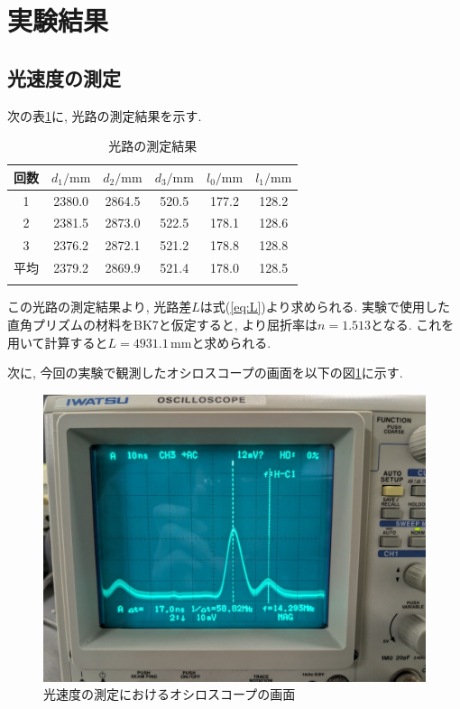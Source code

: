 \documentclass{jarticle}
\begin{document}
\section{実験結果}


\subsection{光速度の測定}

次の表\ref{tb:lightspeed-distance}に, 光路の測定結果を示す.

\begin{table}[h]
  \centering
  \caption{光路の測定結果}
  \begin{tabular}{cccccc}
    \hline
    回数 & $d_1/\mathrm{mm}$ & $d_2/\mathrm{mm}$ & $d_3/\mathrm{mm}$ & $l_0/\mathrm{mm}$ & $l_1/\mathrm{mm}$ \\
    \hline
    1 & 2380.0 & 2864.5 & 520.5 & 177.2 & 128.2 \\
    2 & 2381.5 & 2873.0 & 522.5 & 178.1 & 128.6 \\
    3 & 2376.2 & 2872.1 & 521.2 & 178.8 & 128.8 \\
    \hline
    平均 & 2379.2 & 2869.9 & 521.4 & 178.0 & 128.5 \\
    \hline
    \label{tb:lightspeed-distance}
  \end{tabular}
\end{table}

この光路の測定結果より, 光路差$L$は式(\ref{eq:L})より求められる.
実験で使用した直角プリズムの材料をBK7と仮定すると, \cite{Glass-Materials}より屈折率は$n=1.513$となる.
これを用いて計算すると$L=4931.1\,\mathrm{mm}$と求められる.

次に, 今回の実験で観測したオシロスコープの画面を以下の図\ref{fg:lightspeed-oscilloscope}に示す.

\begin{figure}[H]
  \begin{center}
    \includegraphics[scale=0.3]{lightspeed_result_picture.jpg}
    \caption{光速度の測定におけるオシロスコープの画面}
    \label{fg:lightspeed-oscilloscope}
  \end{center}
\end{figure}
\end{document}
